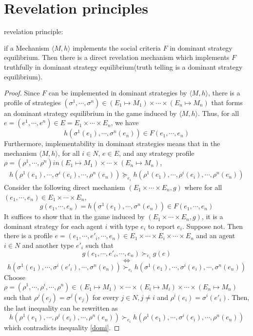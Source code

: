
\chapter{Revelation principles} %

\label{Appendix_A} %

\begin{thm*}
revelation principle:

if a Mechanism $\langle M, h\rangle$ implements the social criteria 
$F$ in dominant strategy
equilibrium. Then there is a direct revelation mechanism which
implements $F$ truthfully in dominant strategy equilibrium(truth
telling is a dominant strategy equilibrium). 

\end{thm*}
\begin{proof}
 Since $F$ can be implemented in dominant strategies by  $\langle M, h\rangle$, there is a profile of strategies $(\sigma^1,\cdots,
 \sigma^n)\in (E_1\mapsto M_1)\times \cdots\times (E_n\mapsto M_n)$
 that forms an dominant strategy  equilibrium in the game induced by $\langle M, h\rangle$. Thus, for
 all $e=(e^1, \cdots,e^n)\in E=E_1\times \cdots\times E_n$, we have
 $$h(\sigma^1(e_1),\cdots,\sigma^n(e_n))\in F(e_1,\cdots,e_n)$$
 Furthermore, implementability in dominant strategies means that  in
 the mechanism $\langle M, h\rangle$, for
 all $i\in N$, $e\in E$, and any  strategy profile
 $\rho=(\rho^1,\cdots,\rho^n) in (E_1\mapsto M_1)\times \cdots\times (E_n\mapsto M_n)$,
 \begin{align}\label{domi}
 h(\rho^1(e_1),\cdots,\sigma^i(e_i),\cdots,\rho^n(e_n)) \succeq_{e_i} h(\rho^1(e_1),\cdots,\rho^i(e_i),\cdots,\rho^n(e_n))
 \end{align}
Consider the following direct mechanism $(E_1\times\cdots\times E_n, g)$ where for all $(e_1,\cdots,e_n)\in E_1\times\cdots\times E_n$,
$$g(e_1,\cdots,e_n)=h(\sigma^1(e_1),\cdots,\sigma^n(e_n))\in F(e_1,\cdots,e_n)$$
It suffices to show that in the game induced by
$(E_1\times\cdots\times E_n, g)$, it is a dominant strategy  for each agent 
$i$ with type $e_i$ to report $e_i$. Suppose not. Then there is a
profile $e=(e_1,\cdots, e'_i, \cdots, e_n)\in E_1\times\cdots \times
E_i \times \cdots \times E_n$ and an
agent $i\in N$ and another type $e'_i$ such that
$$g(e_1, \cdots, e'_i, \cdots, e_n) \succ_{e_i} g(e)$$
$$\Longleftrightarrow$$
$$h(\sigma^1(e_1),\cdots,\sigma^i(e'_i),\cdots,\sigma^n(e_n))\succ_{e_i} h(\sigma^1(e_1),\cdots,\sigma^i(e_i),\cdots,\sigma^n(e_n))$$
Choose  $\rho=(\rho^1,\cdots,\rho^i,\cdots,
 \rho^n)\in (E_1\mapsto M_1)\times \cdots\times (E_i\mapsto M_i)
 \times \cdots\times (E_n\mapsto M_n)$ such that
 $\rho^j(e_j)=\sigma^j(e_j)$ for every $j \in N, j\not = i$ and $\rho^i(e_i)=\sigma^i(e'_i)$. Then, the last inequality can be rewritten as
$$h(\rho^1(e_1),\cdots,\rho^i(e_i),\cdots,\rho^n(e_n))\succ_{e_i}h(\rho^1(e_1),\cdots,\sigma^i(e_i),\cdots,\rho^n(e_n))$$
which contradicts inequality \ref{domi}.
 \end{proof}

